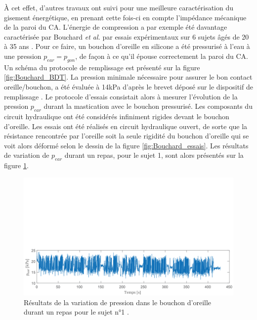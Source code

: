 À cet effet, d'autres travaux ont suivi pour une meilleure caractérisation du gisement énergétique, en prenant cette fois-ci en compte l'impédance mécanique de la paroi du CA. L'énergie de compression a par exemple été davantage caractérisée par Bouchard \emph{et al.} par essais expérimentaux sur 6 sujets âgés de 20 à 35 ans \cite{Bouchard-Roy2020}. Pour ce faire, un bouchon d'oreille en silicone a été pressurisé à l'eau à une pression $p_{ear} = p_{gon}$, de façon à ce qu'il épouse correctement la paroi du CA. Un schéma du protocole de remplissage est présenté sur la figure \ref{fig:Bouchard_BDT}. La pression minimale nécessaire pour assurer le bon contact oreille/bouchon, a été évaluée à 14kPa d'après le brevet déposé sur le dispositif de remplissage \cite{TURCOT2011}. Le protocole d'essais consistait alors à mesurer l'évolution de la pression $p_{ear}$ durant la mastication avec le bouchon pressurisé. Les composants du circuit hydraulique ont été considérés infiniment rigides devant le bouchon d'oreille. Les essais ont été réalisés en circuit hydraulique ouvert, de sorte que la résistance rencontrée par l'oreille soit la seule rigidité du bouchon d'oreille qui se voit alors déformé selon le dessin de la figure \ref{fig:Bouchard_essais}. Les résultats de variation de $p_{ear}$ durant un repas, pour le sujet 1, sont alors présentés sur la figure \ref{fig:Bouchard_pression_puissance}.
\begin{figure}[!htbp]
\begin{center}
    \captionsetup{justification=centering}
	\includegraphics[trim={0cm 0cm 0cm 11cm},clip, width=\textwidth]{../Chap2/Figure/Bouchard_pression.pdf}
	\caption{Résultats de la variation de pression dans le bouchon d'oreille durant un repas pour le sujet \ang{n}1 \cite{Bouchard-Roy2020}.}
	\label{fig:Bouchard_pression_puissance}
\end{center}
\end{figure}

